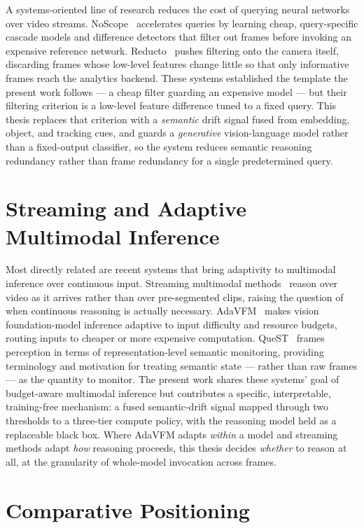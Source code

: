A systems-oriented line of research reduces the cost of querying neural
networks over video streams. NoScope~\cite{Kang2017NoScope} accelerates
queries by learning cheap, query-specific cascade models and difference
detectors that filter out frames before invoking an expensive reference
network. Reducto~\cite{Li2020Reducto} pushes filtering onto the camera itself,
discarding frames whose low-level features change little so that only
informative frames reach the analytics backend. These systems established the
template the present work follows --- a cheap filter guarding an expensive
model --- but their filtering criterion is a low-level feature difference tuned
to a fixed query. This thesis replaces that criterion with a \emph{semantic}
drift signal fused from embedding, object, and tracking cues, and guards a
\emph{generative} vision-language model rather than a fixed-output classifier,
so the system reduces semantic reasoning redundancy rather than frame
redundancy for a single predetermined query.

\section{Streaming and Adaptive Multimodal Inference}
\label{sec:lit-streaming}

Most directly related are recent systems that bring adaptivity to multimodal
inference over continuous input. Streaming multimodal
methods~\cite{StreamingVLM} reason over video as it arrives rather than over
pre-segmented clips, raising the question of when continuous reasoning is
actually necessary. AdaVFM~\cite{AdaVFM} makes vision foundation-model
inference adaptive to input difficulty and resource budgets, routing inputs to
cheaper or more expensive computation. QueST~\cite{QueST} frames perception in
terms of representation-level semantic monitoring, providing terminology and
motivation for treating semantic state --- rather than raw frames --- as the
quantity to monitor. The present work shares these systems' goal of
budget-aware multimodal inference but contributes a specific, interpretable,
training-free mechanism: a fused semantic-drift signal mapped through two
thresholds to a three-tier compute policy, with the reasoning model held as a
replaceable black box. Where AdaVFM adapts \emph{within} a model and streaming
methods adapt \emph{how} reasoning proceeds, this thesis decides \emph{whether}
to reason at all, at the granularity of whole-model invocation across frames.

\section{Comparative Positioning}
\label{sec:lit-comparison}

